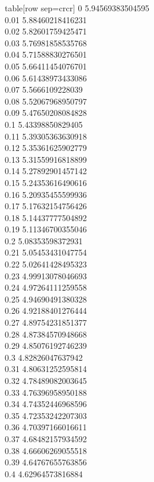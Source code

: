   table[row sep=crcr]{%
0	5.94569383504595\\
0.01	5.88460218416231\\
0.02	5.82601759425471\\
0.03	5.76981858535768\\
0.04	5.71588830276501\\
0.05	5.66411454076701\\
0.06	5.61438973433086\\
0.07	5.5666109228039\\
0.08	5.52067968950797\\
0.09	5.47650208084828\\
0.1	5.43398850829405\\
0.11	5.39305363630918\\
0.12	5.35361625902779\\
0.13	5.31559916818899\\
0.14	5.27892901457142\\
0.15	5.24353616490616\\
0.16	5.20935455599936\\
0.17	5.17632154756426\\
0.18	5.14437777504892\\
0.19	5.11346700355046\\
0.2	5.08353598372931\\
0.21	5.05453431047754\\
0.22	5.02641428495323\\
0.23	4.99913078046693\\
0.24	4.97264111259558\\
0.25	4.94690491380328\\
0.26	4.92188401276444\\
0.27	4.89754231851377\\
0.28	4.87384570948668\\
0.29	4.85076192746239\\
0.3	4.82826047637942\\
0.31	4.80631252595814\\
0.32	4.78489082003645\\
0.33	4.76396958950188\\
0.34	4.74352446968596\\
0.35	4.72353242207303\\
0.36	4.70397166016611\\
0.37	4.68482157934592\\
0.38	4.66606269055518\\
0.39	4.64767655763856\\
0.4	4.62964573816884\\
}
